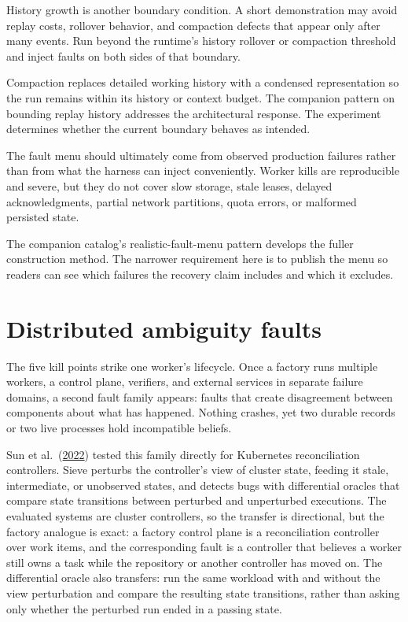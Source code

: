 History growth is another boundary condition. A short demonstration may avoid replay costs, rollover behavior, and compaction defects that appear only after many events. Run beyond the runtime's history rollover or compaction threshold and inject faults on both sides of that boundary.

Compaction replaces detailed working history with a condensed representation so the run remains within its history or context budget. The companion pattern on bounding replay history addresses the architectural response. The experiment determines whether the current boundary behaves as intended.

The fault menu should ultimately come from observed production failures rather than from what the harness can inject conveniently. Worker kills are reproducible and severe, but they do not cover slow storage, stale leases, delayed acknowledgments, partial network partitions, quota errors, or malformed persisted state.

The companion catalog's realistic-fault-menu pattern develops the fuller construction method. The narrower requirement here is to publish the menu so readers can see which failures the recovery claim includes and which it excludes.

\hypertarget{distributed-ambiguity-faults}{%
\section{Distributed ambiguity faults}\label{distributed-ambiguity-faults}}

The five kill points strike one worker's lifecycle. Once a factory runs multiple workers, a control plane, verifiers, and external services in separate failure domains, a second fault family appears: faults that create disagreement between components about what has happened. Nothing crashes, yet two durable records or two live processes hold incompatible beliefs.

Sun et al.~(\href{https://www.usenix.org/system/files/osdi22-sun.pdf}{2022}) tested this family directly for Kubernetes reconciliation controllers. Sieve perturbs the controller's view of cluster state, feeding it stale, intermediate, or unobserved states, and detects bugs with differential oracles that compare state transitions between perturbed and unperturbed executions. The evaluated systems are cluster controllers, so the transfer is directional, but the factory analogue is exact: a factory control plane is a reconciliation controller over work items, and the corresponding fault is a controller that believes a worker still owns a task while the repository or another controller has moved on. The differential oracle also transfers: run the same workload with and without the view perturbation and compare the resulting state transitions, rather than asking only whether the perturbed run ended in a passing state.

